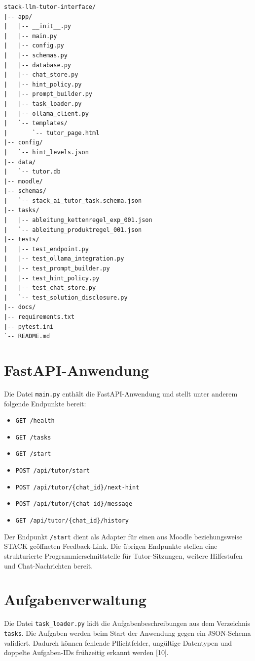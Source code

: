\documentclass[11pt,a4paper,oneside,ngerman]{memoir}
\begin{document}
\begin{verbatim}
stack-llm-tutor-interface/
|-- app/
|   |-- __init__.py
|   |-- main.py
|   |-- config.py
|   |-- schemas.py
|   |-- database.py
|   |-- chat_store.py
|   |-- hint_policy.py
|   |-- prompt_builder.py
|   |-- task_loader.py
|   |-- ollama_client.py
|   `-- templates/
|       `-- tutor_page.html
|-- config/
|   `-- hint_levels.json
|-- data/
|   `-- tutor.db
|-- moodle/
|-- schemas/
|   `-- stack_ai_tutor_task.schema.json
|-- tasks/
|   |-- ableitung_kettenregel_exp_001.json
|   `-- ableitung_produktregel_001.json
|-- tests/
|   |-- test_endpoint.py
|   |-- test_ollama_integration.py
|   |-- test_prompt_builder.py
|   |-- test_hint_policy.py
|   |-- test_chat_store.py
|   `-- test_solution_disclosure.py
|-- docs/
|-- requirements.txt
|-- pytest.ini
`-- README.md
\end{verbatim}

\section{FastAPI-Anwendung}

Die Datei \texttt{main.py} enthält die FastAPI-Anwendung und stellt unter anderem folgende Endpunkte bereit:

\begin{itemize}
    \item \texttt{GET /health}
    \item \texttt{GET /tasks}
    \item \texttt{GET /start}
    \item \texttt{POST /api/tutor/start}
    \item \texttt{POST /api/tutor/\{chat\_id\}/next-hint}
    \item \texttt{POST /api/tutor/\{chat\_id\}/message}
    \item \texttt{GET /api/tutor/\{chat\_id\}/history}
\end{itemize}

Der Endpunkt \texttt{/start} dient als Adapter für einen aus Moodle beziehungsweise STACK geöffneten Feedback-Link. Die übrigen Endpunkte stellen eine strukturierte Programmierschnittstelle für Tutor-Sitzungen, weitere Hilfestufen und Chat-Nachrichten bereit.

\section{Aufgabenverwaltung}

Die Datei \texttt{task\_loader.py} lädt die Aufgabenbeschreibungen aus dem Verzeichnis \texttt{tasks}. Die Aufgaben werden beim Start der Anwendung gegen ein JSON-Schema validiert. Dadurch können fehlende Pflichtfelder, ungültige Datentypen und doppelte Aufgaben-IDs frühzeitig erkannt werden [10].
\end{document}
